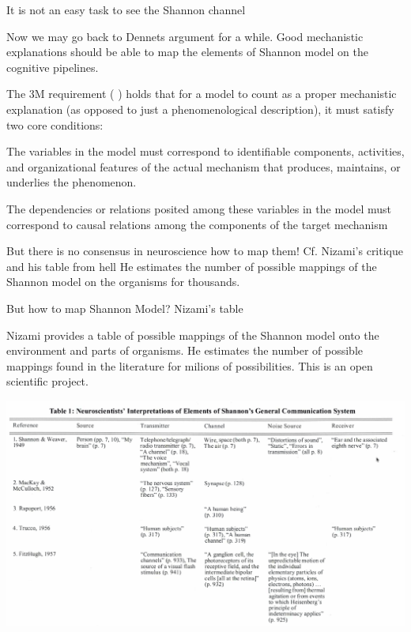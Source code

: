 \documentclass[10pt, aspectratio=169]{beamer}
\begin{document}
    \begin{frame} {It is not an easy task to see the Shannon channel}
    
        Now we may go back to Dennets argument for a while. Good mechanistic explanations should be able to map the elements of Shannon model on the cognitive pipelines. 
     
     The 3M requirement (\cite{kaplan_explanatory_2011-1} ) holds that for a model to count as a proper mechanistic explanation (as opposed to just a phenomenological description), it must satisfy two core conditions:
     
     The variables in the model must correspond to identifiable components, activities, and organizational features of the actual mechanism that produces, maintains, or underlies the phenomenon.
     
     The dependencies or relations posited among these variables in the model must correspond to causal relations among the components of the target mechanism
     
     But there is no consensus in neuroscience how to map them!   Cf.  Nizami's critique and his table from hell \cite{nizami_information_2019}
     He estimates the number of possible mappings of the Shannon model on the organisms for thousands. 
     
     
     \end{frame}

\begin{frame}  {But how to map Shannon Model? Nizami's table} 
   
  Nizami provides a table of possible mappings of the Shannon model onto the environment and parts of organisms. He estimates the number of possible mappings found in the literature for milions of possibilities. This is an open scientific project.
        \begin{center}
            \includegraphics[width=1\textwidth]{images/Nizami_table1.png}
        \end{center}

\end{frame}
\end{document}
